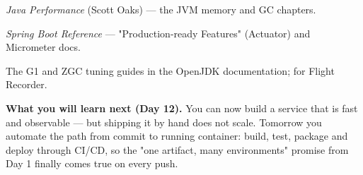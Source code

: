 \begin{wbitem}
  \item \emph{Java Performance} (Scott Oaks) --- the JVM memory and GC chapters.
  \item \emph{Spring Boot Reference} --- "Production-ready Features" (Actuator) and Micrometer docs.
  \item The G1 and ZGC tuning guides in the OpenJDK documentation;  for Flight Recorder.
\end{wbitem}

\begin{keyidea}
\textbf{What you will learn next (Day 12).} You can now build a service that is fast and observable --- but shipping it by hand does not scale. Tomorrow you automate the path from commit to running container: build, test, package and deploy through CI/CD, so the "one artifact, many environments" promise from Day 1 finally comes true on every push.
\end{keyidea}
